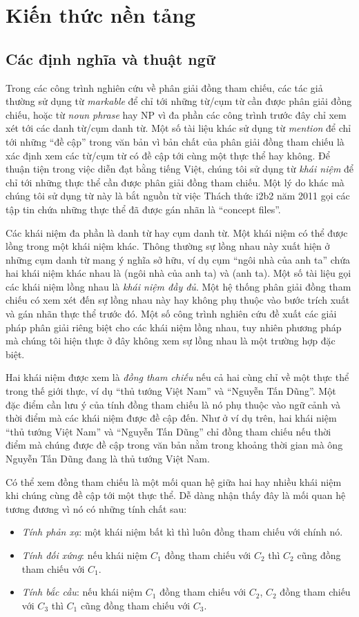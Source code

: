 \chapter{Kiến thức nền tảng}
\section{Các định nghĩa và thuật ngữ}
Trong các công trình nghiên cứu về phân giải đồng tham chiếu, các tác giả thường sử dụng từ \emph{markable} để chỉ tới những từ/cụm từ cần được phân giải đồng chiếu, hoặc từ \emph{noun phrase} hay NP vì đa phần các công trình trước đây chỉ xem xét tới các danh từ/cụm danh từ. Một số tài liệu khác sử dụng từ \emph{mention} để chỉ tới những ``đề cập'' trong văn bản vì bản chất của phân giải đồng tham chiếu là xác định xem các từ/cụm từ có đề cập tới cùng một thực thể hay không. Để thuận tiện trong việc diễn đạt bằng tiếng Việt, chúng tôi sử dụng từ \emph{khái niệm} để chỉ tới những thực thể cần được phân giải đồng tham chiếu. Một lý do khác mà chúng tôi sử dụng từ này là bắt nguồn từ việc Thách thức i2b2 năm 2011 gọi các tập tin chứa những thực thể đã được gán nhãn là ``concept files''.

Các khái niệm đa phần là danh từ hay cụm danh từ. Một khái niệm có thể được lồng trong một khái niệm khác. Thông thường sự lồng nhau này xuất hiện ở những cụm danh từ mang ý nghĩa sở hữu, ví dụ cụm ``ngôi nhà của anh ta'' chứa hai khái niệm khác nhau là (ngôi nhà của anh ta) và (anh ta). Một số tài liệu gọi các khái niệm lồng nhau là \emph{khái niệm đầy đủ}. Một hệ thống phân giải đồng tham chiếu có xem xét đến sự lồng nhau này hay không phụ thuộc vào bước trích xuất và gán nhãn thực thể trước đó. Một số công trình nghiên cứu đề xuất các giải pháp phân giải riêng biệt cho các khái niệm lồng nhau, tuy nhiên phương pháp mà chúng tôi hiện thực ở đây không xem sự lồng nhau là một trường hợp đặc biệt.

Hai khái niệm được xem là \emph{đồng tham chiếu} nếu cả hai cùng chỉ về một thực thể trong thế giới thực, ví dụ ``thủ tướng Việt Nam'' và ``Nguyễn Tấn Dũng''. Một đặc điểm cần lưu ý của tính đồng tham chiếu là nó phụ thuộc vào ngữ cảnh và thời điểm mà các khái niệm được đề cập đến. Như ở ví dụ trên, hai khái niệm ``thủ tướng Việt Nam'' và ``Nguyễn Tấn Dũng'' chỉ đồng tham chiếu nếu thời điểm mà chúng được đề cập trong văn bản nằm trong khoảng thời gian mà ông Nguyễn Tấn Dũng đang là thủ tướng Việt Nam.

Có thể xem đồng tham chiếu là một mối quan hệ giữa hai hay nhiều khái niệm khi chúng cùng đề cập tới một thực thể. Dễ dàng nhận thấy đây là mối quan hệ tương đương vì nó có những tính chất sau:
\begin{itemize}
\item \emph{Tính phản xạ}: một khái niệm bất kì thì luôn đồng tham chiếu với chính nó.
\item \emph{Tính đối xứng}: nếu khái niệm $C_1$ đồng tham chiếu với $C_2$ thì $C_2$ cũng đồng tham chiếu với $C_1$.
\item \emph{Tính bắc cầu}: nếu khái niệm $C_1$ đồng tham chiếu với $C_2$, $C_2$ đồng tham chiếu với $C_3$ thì $C_1$ cũng đồng tham chiếu với $C_3$.
\end{itemize}

